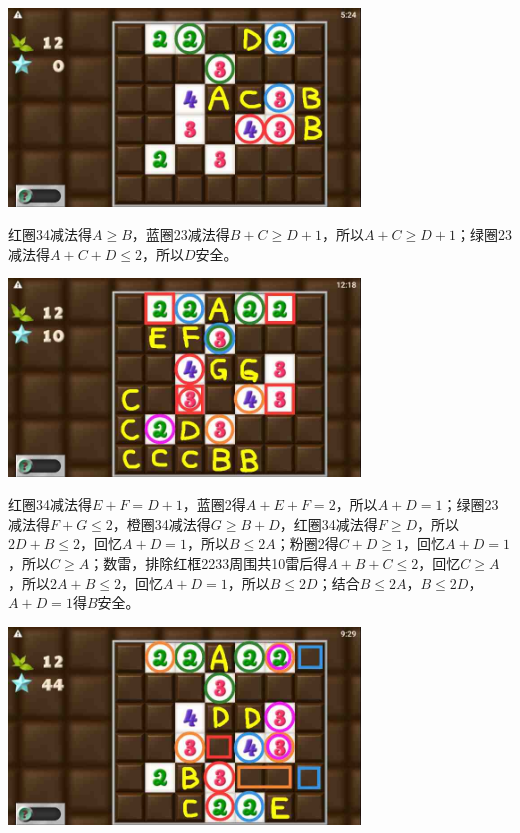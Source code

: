 \subsection{} %
\begin{center}
    \includegraphics[width=0.7\textwidth]{puzzlelow/247-1.jpg}
\end{center}
红圈34减法得$A\ge B$，蓝圈23减法得$B+C\ge D+1$，所以$A+C\ge D+1$；绿圈23减法得$A+C+D\le 2$，所以$D$安全。
\begin{center}
    \includegraphics[width=0.7\textwidth]{puzzlelow/247-2.jpg}
\end{center}
红圈34减法得$E+F=D+1$，蓝圈2得$A+E+F=2$，所以$A+D=1$；绿圈23减法得$F+G\le 2$，橙圈34减法得$G\ge B+D$，红圈34减法得$F\ge D$，所以$2D+B\le 2$，回忆$A+D=1$，所以$B\le 2A$；粉圈2得$C+D\ge 1$，回忆$A+D=1$，所以$C\ge A$；数雷，排除红框2233周围共10雷后得$A+B+C\le 2$，回忆$C\ge A$，所以$2A+B\le 2$，回忆$A+D=1$，所以$B\le 2D$；结合$B\le 2A$，$B\le 2D$，$A+D=1$得$B$安全。
\begin{center}
    \includegraphics[width=0.7\textwidth]{puzzlelow/247-3.jpg}
\end{center}
